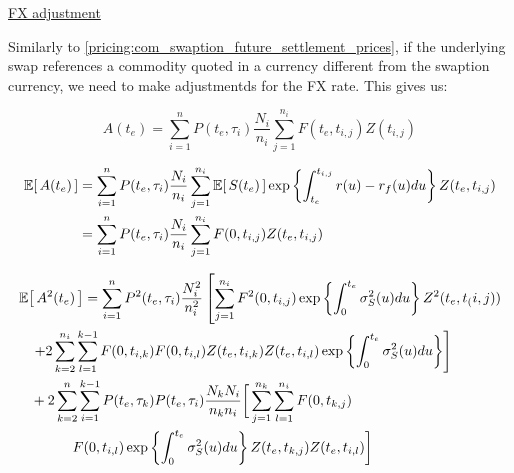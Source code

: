 \underline{FX adjustment}

Similarly to \ref{pricing:com_swaption_future_settlement_prices}, if the underlying swap references a commodity quoted in a currency different from the swaption currency, we need to make adjustmentds for the FX rate. This gives us:

\begin{equation}
A(t_e) = \sum_{i=1}^{n} P(t_e, \tau_i) \frac{N_i}{n_i} \sum_{j=1}^{n_i} F(t_e, t_{i,j}) Z(t_{i,j})
\end{equation}

\begin{equation}
\begin{split}
\Ex{A(t_e)} &= \sum_{i=1}^{n} P(t_e, \tau_i) \frac{N_i}{n_i} \sum_{j=1}^{n_i} \Ex{S(t_e)} \exp \left\{ \int_{t_e}^{t_{i,j}} r(u) - r_f(u) du \right\} Z(t_e, t_{i,j}) \\
            &= \sum_{i=1}^{n} P(t_e, \tau_i) \frac{N_i}{n_i} \sum_{j=1}^{n_i} F(0, t_{i,j}) Z(t_e, t_{i,j})
\end{split}
\end{equation}

\begin{equation}
\begin{split}
& \Ex{A^2(t_e)} = \sum_{i=1}^{n} P^2(t_e, \tau_i) \frac{N^2_i}{n^2_i} \left[ \sum_{j=1}^{n_i} F^2(0, t_{i,j}) \exp \left\{ \int_0^{t_e} \sigma^2_S(u) du \right\} Z^2(t_e, t_(i,j)) \right. \\
              &\quad \left.  + 2 \sum_{k=2}^{n_i} \sum_{l=1}^{k-1} F(0, t_{i,k}) F(0, t_{i,l}) Z(t_e, t_{i,k}) Z(t_e, t_{i,l}) \exp \left\{ \int_0^{t_e} \sigma^2_S(u) du \right\} \right] \\
              &\quad + 2 \sum_{k=2}^{n} \sum_{i=1}^{k-1} P(t_e, \tau_k) P(t_e, \tau_i) \frac{N_k N_i}{n_k n_i} \bigg[ \sum_{j=1}^{n_k} \sum_{l=1}^{n_i} F(0, t_{k,j}) \bigg. \\
              &\qquad \qquad \bigg. F(0, t_{i,l}) \exp \left\{ \int_0^{t_e} \sigma^2_S(u) du \right\} Z(t_e, t_{k,j}) Z(t_e, t_{i,l}) \bigg]
\end{split}
\end{equation}